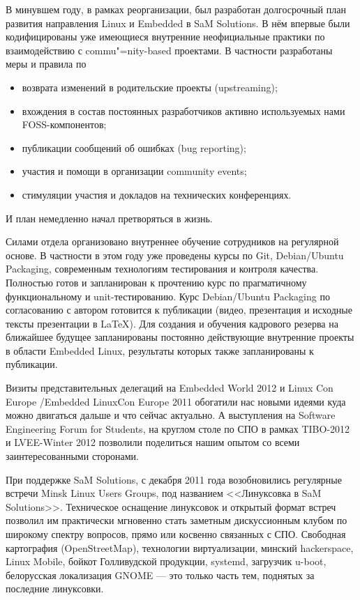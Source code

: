 \documentclass[10pt, a5paper]{article}
\begin{document}
В минувшем году, в рамках реорганизации, был разработан долгосрочный план развития направления Linux и Embedded в SaM Solutions. В нём впервые были кодифицированы уже имеющиеся внутренние неофициальные практики по взаимодействию с commu"=nity-based проектами. В частности разработаны меры и правила по
\begin{itemize}
  \item возврата изменений в родительские проекты (upstreaming);
  \item вхождения в состав постоянных разработчиков активно используемых нами FOSS-компонентов;
  \item публикации сообщений об ошибках (bug reporting);
  \item участия и помощи в организации community events;
  \item стимуляции участия и докладов на технических конференциях.
\end{itemize}
И план немедленно начал претворяться в жизнь.

Силами отдела организовано внутреннее обучение сотрудников на регулярной основе. В частности в этом году уже проведены курсы по Git, Debian/Ubuntu Packaging, современным технологиям тестирования и контроля качества. Полностью готов и запланирован к прочтению курс по прагматичному функциональному и unit-тестированию.  Курс Debian/Ubuntu Packaging по согласованию с автором готовится к публикации (видео, презентация и исходные тексты презентации в \LaTeX). Для создания и обучения кадрового резерва на ближайшее будущее запланированы постоянно действующие внутренние проекты в области Embedded Linux, результаты которых также запланированы к публикации.

Визиты представительных делегаций на Embedded World 2012 и Linux Con Europe /Embedded LinuxCon Europe 2011 обогатили нас новыми идеями куда можно двигаться дальше и что сейчас актуально. А выступления на Software Engineering Forum for Students, на круглом столе по СПО в рамках TIBO-2012 и LVEE-Winter 2012 позволили поделиться нашим опытом со всеми заинтересованными сторонами.

При поддержке SaM Solutions, с декабря 2011 года возобновились регулярные встречи Minsk Linux Users Groups, под названием <<Линуксовка в SaM Solutions>>. Техническое оснащение линуксовок и открытый формат встреч позволил им практически мгновенно стать заметным дискуссионным клубом по широкому спектру вопросов, прямо или косвенно связанных с СПО. Свободная картография (OpenStreetMap), технологии виртуализации, минский \linebreak hackerspace, Linux Mobile, бойкот Голливудской продукции, systemd, загрузчик u-boot, белорусская локализация GNOME --- это только часть тем, поднятых за последние линуксовки.
\end{document}
